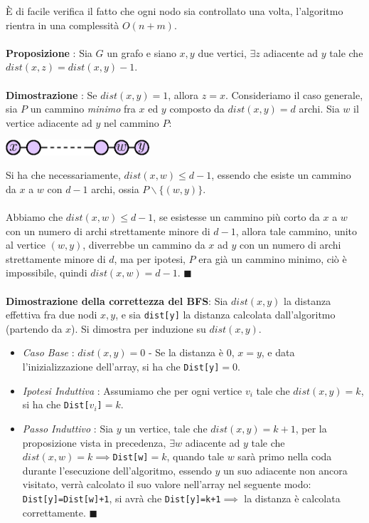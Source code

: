 \documentclass[12pt, letterpaper]{article}
\newcommand{\codee}[1]{\colorbox{white}{\texttt{#1}}}
\newcommand{\acc}{\\\hphantom{}\\}
\begin{document}
È di facile verifica il fatto che ogni nodo sia controllato una volta, l'algoritmo rientra in una complessità $O(n+m)$.\acc
\textbf{Proposizione }: Sia $G$ un grafo e siano $x,y$ due vertici, $\exists z $ adiacente ad $y$ tale che
$dist(x,z)=dist(x,y)-1$.\acc
\textbf{Dimostrazione }: Se $dist(x,y)=1$, allora $z=x$. Consideriamo il caso generale, sia $P$ un cammino
\textit{minimo} fra $x$ ed $y$ composto da $dist(x,y)=d$ archi. Sia $w$ il vertice adiacente ad $y$ nel cammino $P$:
\begin{center}
    \includegraphics[width=0.4\textwidth ]{images/xvy.eps}
\end{center}
Si ha che necessariamente, $dist(x,w)\le d-1$, essendo che esiste un cammino da $x$ a $w$ con $d-1$ archi,
ossia $P\backslash \{(w,y)\}$.\acc
Abbiamo che  $dist(x,w)\le d-1$, se esistesse un cammino più corto da $x$ a $w$ con un numero di archi strettamente
minore di $d-1$, allora tale cammino, unito al vertice $(w,y)$, diverrebbe un cammino da $x$ ad $y$ con un numero di
archi strettamente minore di $d$, ma per ipotesi, $P$ era già un cammino minimo, ciò è impossibile, quindi
$dist(x,w)=d-1$. $\blacksquare$\acc
\textbf{Dimostrazione della correttezza del BFS}: Sia $dist(x,y)$ la distanza effettiva fra due nodi $x,y$, e sia
\codee{dist[y]} la distanza calcolata dall'algoritmo (partendo da $x$). Si dimostra per induzione su $dist(x,y)$.\begin{itemize}
    \item \textit{Caso Base} : $dist(x,y)=0$ - Se la distanza è $0$, $x=y$, e data l'inizializzazione dell'array, si ha che
          \codee{Dist[y]}$=0$.
    \item \textit{Ipotesi Induttiva} : Assumiamo che per ogni vertice $v_i$ tale che $dist(x,y)=k$, si ha che \codee{Dist[$v_i$]}$=k$.
    \item \textit{Passo Induttivo} : Sia $y$ un vertice, tale che $dist(x,y)=k+1$, per la proposizione vista in precedenza,
          $\exists w$ adiacente ad $y$ tale che $dist(x,w)=k\implies$\codee{Dist[w]}$=k$, quando tale $w$ sarà primo nella coda
          durante l'esecuzione dell'algoritmo, essendo $y$ un suo adiacente non ancora visitato, verrà calcolato il suo
          valore nell'array nel seguente modo: \codee{Dist[y]=Dist[w]+1}, si avrà che \codee{Dist[y]=k+1}$\implies$ la distanza è
          calcolata correttamente. $\blacksquare$
\end{itemize}
\end{document}
